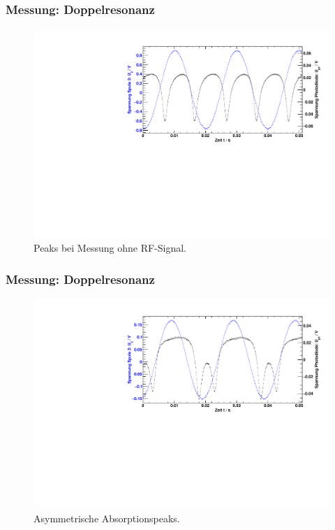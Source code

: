 \begin{frame}
\frametitle{Messung: Doppelresonanz}
\begin{figure}
    \begin{center}
        \includegraphics[width=\textwidth]{../img/07.pdf}
        \caption{Peaks bei Messung ohne RF-Signal.}
        \label{img:dehmelt}
    \end{center}
\end{figure}
\end{frame}


\begin{frame}
\frametitle{Messung: Doppelresonanz}
\begin{figure}
    \begin{center}
        \includegraphics[width=\textwidth]{../img/11.pdf}
        \caption{Asymmetrische Absorptionspeaks.}
        \label{img:rfwrong}
    \end{center}
\end{figure}
\end{frame}



